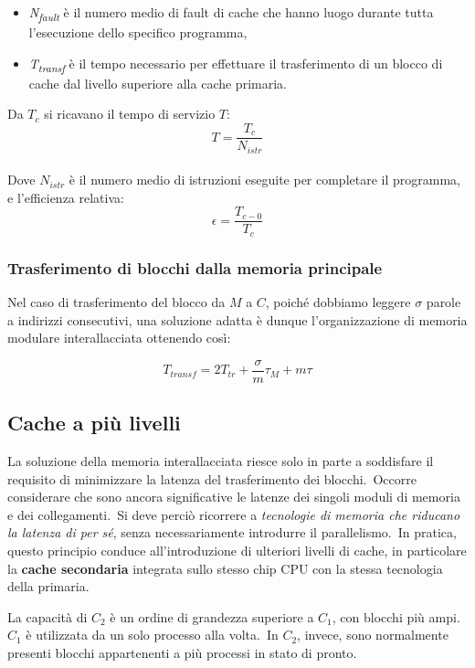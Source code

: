 \begin{itemize}
    \item \textit{N\textsubscript{fault}} è il numero medio di fault di cache che hanno luogo durante tutta l'esecuzione dello specifico programma,
    \item \textit{T\textsubscript{transf}} è il tempo necessario per effettuare il trasferimento di un blocco di cache dal livello superiore alla cache primaria.
\end{itemize}

\noindent Da $T_c$ si ricavano il tempo di servizio $T$:\ \[T=\frac{T_c}{N_{\mathit{istr}}}\]\\
Dove $N_{\mathit{istr}}$ è il numero medio di istruzioni eseguite per completare il programma, e l'efficienza relativa:\ \[\epsilon = \frac{T_{c-0}}{T_c}\]

\subsubsection{Trasferimento di blocchi dalla memoria principale}

Nel caso di trasferimento del blocco da $M$ a $C$, poiché dobbiamo leggere $\sigma$ parole a indirizzi consecutivi, una soluzione adatta è dunque l'organizzazione di memoria modulare interallacciata ottenendo così:

\[T_{\mathit{transf}} = 2T_{tr} + \frac{\sigma}{m}\tau_M+m\tau\]

\subsection{Cache a più livelli}

La soluzione della memoria interallacciata riesce solo in parte a soddisfare il requisito di minimizzare la
latenza del trasferimento dei blocchi.\
Occorre considerare che sono ancora significative le latenze dei singoli moduli di memoria e dei collegamenti.\
Si deve perciò ricorrere a \textit{tecnologie di memoria che riducano la latenza di per sé}, senza necessariamente introdurre il parallelismo.\
In pratica, questo principio conduce all'introduzione di ulteriori livelli di cache, in particolare la \textbf{cache secondaria} integrata sullo stesso chip CPU con la stessa tecnologia della primaria.

La capacità di $C_2$ è un ordine di grandezza superiore a $C_1$, con blocchi più ampi.\
$C_1$ è utilizzata da un solo processo alla volta.\
In $C_2$, invece, sono normalmente presenti blocchi appartenenti a più processi in stato di pronto.

